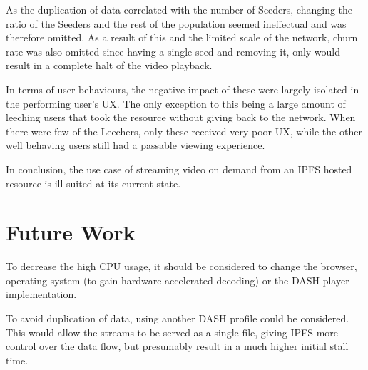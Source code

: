 As the duplication of data correlated with the number of Seeders, changing the ratio of the Seeders and the rest of the population seemed ineffectual and was therefore omitted. As a result of this and the limited scale of the network, churn rate was also omitted since having a single seed and removing it, only would result in a complete halt of the video playback.

In terms of user behaviours, the negative impact of these were largely isolated in the performing user's \ac{UX}. The only exception to this being a large amount of leeching users that took the resource without giving back to the network. When there were few of the Leechers, only these received very poor \ac{UX}, while the other well behaving users still had a passable viewing experience.

In conclusion, the use case of streaming video on demand from an \ac{IPFS} hosted resource is ill-suited at its current state.

\section{Future Work}
To decrease the high \ac{CPU} usage, it should be considered to change the browser, operating system (to gain hardware accelerated decoding) or the \ac{DASH} player implementation.

To avoid duplication of data, using another \ac{DASH} profile could be considered. This would allow the streams to be served as a single file, giving \ac{IPFS} more control over the data flow, but presumably result in a much higher initial stall time.


